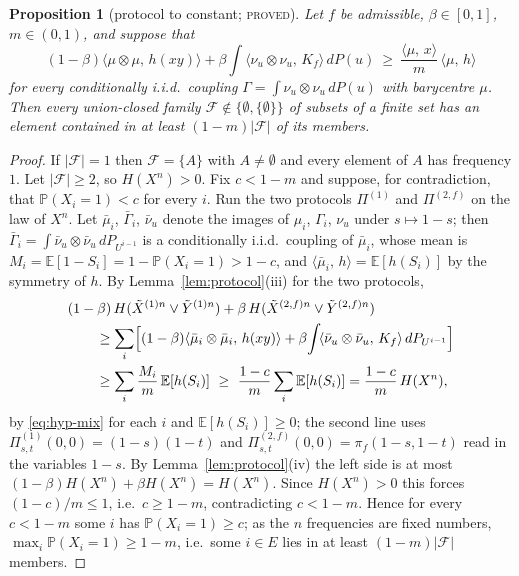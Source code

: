 \documentclass[11pt]{article}
\theoremstyle{plain}
\newtheorem{proposition}[theorem]{Proposition}
\theoremstyle{definition}
\theoremstyle{remark}
\newcommand{\E}{\mathbb{E}}
\newcommand{\Prob}{\mathbb{P}}
\newcommand{\pr}[2]{\langle #1,\,#2\rangle}
\newcommand{\lbl}[1]{\textsc{#1}}
\begin{document}
\begin{proposition}[protocol to constant; \lbl{proved}]\label{prop:route}
Let $f$ be admissible, $\beta\in[0,1]$, $m\in(0,1)$, and suppose that
\begin{equation}\label{eq:hyp-mix}
  (1-\beta)\pr{\mu\otimes\mu}{h(xy)}+\beta\int\pr{\nu_u\otimes\nu_u}{K_f}\,dP(u)
  \ \ge\ \frac{\pr{\mu}{x}}{m}\,\pr{\mu}{h}
\end{equation}
for every conditionally i.i.d.\ coupling $\Gamma=\int\nu_u\otimes\nu_u\,dP(u)$
with barycentre $\mu$.  Then every union-closed family
$\mathcal F\notin\{\emptyset,\{\emptyset\}\}$ of subsets of a finite set has
an element contained in at least $(1-m)|\mathcal F|$ of its members.
\end{proposition}
\begin{proof}
If $|\mathcal F|=1$ then $\mathcal F=\{A\}$ with $A\neq\emptyset$ and every
element of $A$ has frequency $1$.  Let $|\mathcal F|\ge2$, so
$H(X^n)>0$.  Fix $c<1-m$ and suppose, for contradiction, that
$\Prob(X_i=1)<c$ for every $i$.  Run the two protocols $\Pi^{(1)}$ and
$\Pi^{(2,f)}$ on the law of $X^n$.  Let $\bar\mu_i$, $\bar\Gamma_i$,
$\bar\nu_u$
denote the images of $\mu_i$, $\Gamma_i$, $\nu_u$ under $s\mapsto1-s$; then
$\bar\Gamma_i=\int\bar\nu_u\otimes\bar\nu_u\,dP_{U^{i-1}}$ is a conditionally
i.i.d.\ coupling of $\bar\mu_i$, whose mean is
$M_i=\E[1-S_i]=1-\Prob(X_i=1)>1-c$, and $\pr{\bar\mu_i}{h}=\E[h(S_i)]$ by
the symmetry of $h$.  By Lemma~\ref{lem:protocol}(iii) for the two protocols,
\begin{align*}
&(1-\beta)\,H(\tilde X^{(1)n}\vee\tilde Y^{(1)n})+\beta\,H(\tilde X^{(2,f)n}\vee\tilde Y^{(2,f)n})\\
&\qquad\ge\sum_i\Bigl[(1-\beta)\pr{\bar\mu_i\otimes\bar\mu_i}{h(xy)}
+\beta\!\int\!\pr{\bar\nu_u\otimes\bar\nu_u}{K_f}\,dP_{U^{i-1}}\Bigr]\\
&\qquad\ge\sum_i\frac{M_i}{m}\,\E[h(S_i)]
\ \ge\ \frac{1-c}{m}\sum_i\E[h(S_i)]=\frac{1-c}{m}\,H(X^n),
\end{align*}
by \eqref{eq:hyp-mix} for each $i$ and $\E[h(S_i)]\ge0$; the second line uses
$\Pi^{(1)}_{s,t}(0,0)=(1-s)(1-t)$ and
$\Pi^{(2,f)}_{s,t}(0,0)=\pi_f(1-s,1-t)$ read in the variables $1-s$.  By
Lemma~\ref{lem:protocol}(iv) the left side is at most
$(1-\beta)H(X^n)+\beta H(X^n)=H(X^n)$.  Since $H(X^n)>0$ this forces
$(1-c)/m\le1$, i.e.\ $c\ge1-m$, contradicting $c<1-m$.  Hence for
every $c<1-m$ some $i$ has $\Prob(X_i=1)\ge c$; as the $n$ frequencies are
fixed numbers, $\max_i\Prob(X_i=1)\ge1-m$, i.e.\ some $i\in E$ lies in at
least $(1-m)|\mathcal F|$ members.
\end{proof}
\end{document}

